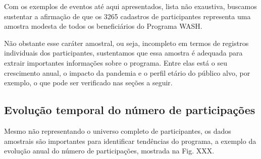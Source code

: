 \documentclass[
12pt,		%
openright,	%
twoside,  %
a4paper,			%
chapter=TITLE,		%
english,			%
french,				%
spanish,			%
brazil				%
]{USPSC-classe/USPSC}
\begin{document}
Com os exemplos de eventos at\'e aqui apresentados, lista n\~ao exaustiva, buscamos sustentar a afirma\c{c}\~ao de que os 3265 cadastros de participantes representa uma amostra modesta de todos os benefici\'arios do Programa WASH.










N\~ao obstante esse car\'ater amostral, ou seja, incompleto em termos de registros individuais dos participantes, sustentamos que essa amostra \'e adequada para extrair importantes informa\c{c}\~oes sobre o programa. Entre elas est\'a o seu crescimento anual, o impacto da pandemia e o perfil et\'ario do p\'ublico alvo, por exemplo, o que pode ser verificado nas se\c{c}\~oes a seguir.










\subsection[Evolu\c{c}\~ao temporal do n\'umero de participa\c{c}\~oes]{Evolu\c{c}\~ao temporal do n\'umero de participa\c{c}\~oes}\label{Evolu\c{c}\~ao temporal do n\'umero de participa\c{c}\~oes}
Mesmo n\~ao representando o universo completo de participantes, os dados amostrais s\~ao importantes para identificar tend\^encias do programa, a exemplo da evolu\c{c}\~ao anual do n\'umero de participa\c{c}\~oes, mostrada na Fig. XXX.
\end{document}
